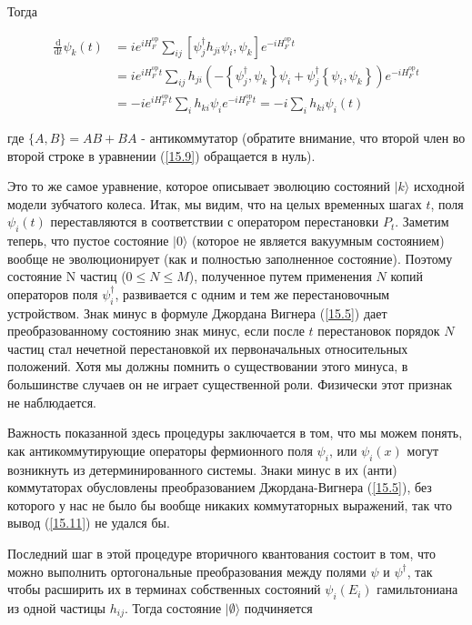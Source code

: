 \documentclass[main.tex]{subfiles}
\begin{document}
Тогда 

\begin{equation}\label{15.9}
	\begin{aligned} \frac{\mathrm{d}}{\mathrm{d} t} \psi_{k}(t) &=i e^{i H_{F}^{\mathrm{op}}} \sum_{i j}\left[\psi_{j}^{\dagger} h_{j i} \psi_{i}, \psi_{k}\right] e^{-i H_{F}^{\mathrm{op}} t} \\ &=i e^{i H_{F}^{\mathrm{op}} t} \sum_{i j} h_{j i}\left(-\left\{\psi_{j}^{\dagger}, \psi_{k}\right\} \psi_{i}+\psi_{j}^{\dagger}\left\{\psi_{i}, \psi_{k}\right\}\right) e^{-i H_{F}^{\mathrm{op}} t} \\ &=-i e^{i H_{F}^{\mathrm{op}} t} \sum_{i} h_{k i} \psi_{i} e^{-i H_{F}^{\mathrm{op}}t}=-i \sum_{i} h_{k i} \psi_{i}(t) \end{aligned}
\end{equation}

где $\{A, B\} = AB + BA$ - антикоммутатор (обратите внимание, что второй член во второй строке в уравнении (\ref{15.9}) обращается в нуль).

Это то же самое уравнение, которое описывает эволюцию состояний $| k\rangle$ исходной модели зубчатого колеса. Итак, мы видим, что на целых временных шагах $t$, поля $\psi_i(t)$ переставляются в соответствии с оператором перестановки $P_t$. Заметим теперь, что пустое состояние $| 0\rangle$ (которое не является вакуумным состоянием) вообще не эволюционирует (как и полностью заполненное состояние). Поэтому состояние N частиц ($0 \le N \le M$), полученное путем применения $N$ копий операторов поля $\psi_i^\dagger$, развивается с одним и тем же перестановочным устройством. Знак минус в формуле Джордана Вигнера (\ref{15.5}) дает преобразованному состоянию знак минус, если после $t$ перестановок порядок $N$ частиц стал нечетной перестановкой их первоначальных относительных положений. Хотя мы должны помнить о существовании этого минуса, в большинстве случаев он не играет существенной роли. Физически этот признак не наблюдается.

Важность показанной здесь процедуры заключается в том, что мы можем понять, как антикоммутирующие операторы фермионного поля $\psi_i$, или $\psi_i(x)$ могут возникнуть из детерминированного системы. Знаки минус в их (анти) коммутаторах обусловлены преобразованием Джордана-Вигнера (\ref{15.5}), без которого у нас не было бы вообще никаких коммутаторных выражений, так что вывод (\ref{15.11}) не удался бы.

Последний шаг в этой процедуре вторичного квантования состоит в том, что можно выполнить ортогональные преобразования между полями $\psi$ и $\psi^\dagger$, так чтобы расширить их в терминах собственных состояний $\psi_i(E_i)$ гамильтониана из одной частицы $h_{ij}$. Тогда состояние $| \emptyset \rangle$ подчиняется
\end{document}
